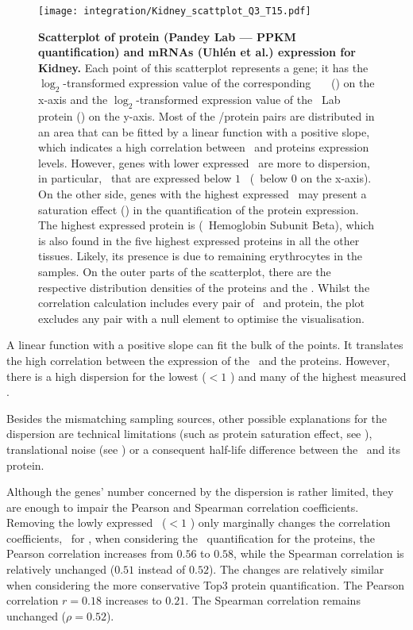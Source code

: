 \begin{figure}[!htbp]
    \texttt{[image: integration/Kidney\_scattplot\_Q3\_T15.pdf]}\centering
    \caption[Scatterplot of protein (Pandey Lab data --- PPKM quantification)
    and mRNA (Uhlén \etal) expression for Kidney]
    {\label{fig:ScatKid}\textbf{Scatterplot of
    protein (Pandey Lab --- PPKM quantification) and mRNAs (Uhlén et al.)
    expression for Kidney.}
    Each point of this scatterplot represents a gene;
    it has the $\log_2$-transformed expression value
    of the corresponding \uhlen\ \etal\ \mRNA\ (\FPKM) on the x-axis and
    the $\log_2$-transformed expression value of
    the \pandey\ Lab protein (\PPKM) on the y-axis.
    Most of the \mRNA/protein pairs are distributed in an area
    that can be fitted by a linear function with a positive slope,
    which indicates a high correlation between \mRNAs\ and proteins expression
    levels.
    However, genes with lower expressed \mRNAs\ are more to dispersion,
    in particular, \mRNAs\ that are expressed below $1$ \FPKM\ (\ie\ below $0$ on
    the x-axis).
    On the other side, genes with the highest expressed \mRNAs\ may present
    a saturation effect ()
    in the quantification of the protein expression.
    The highest expressed protein is 
    (\ie\ Hemoglobin Subunit Beta), which is also found in
    the five highest expressed proteins in all the other tissues.
    Likely, its presence is due to remaining erythrocytes in the samples.
    On the outer parts of the scatterplot,
    there are the respective distribution densities of the proteins and the \mRNAs.
    Whilst the correlation calculation includes every pair of \mRNA\ and protein,
    the plot excludes any pair with a null element to optimise the visualisation.}
\end{figure}

A linear function with a positive slope can fit the bulk of the points.
It translates the high correlation between the expression
of the \mRNAs\ and the proteins.
However, there is a high dispersion for the lowest ($<1$ \FPKM)
and many of the highest measured \mRNAs{}.

Besides the mismatching sampling sources,
other possible explanations for the dispersion are
technical limitations (such as protein saturation effect, see ),
translational noise (see )
or a consequent half-life difference between the \mRNA\ and its protein.

Although the genes' number concerned by the dispersion is rather limited,
they are enough to impair the Pearson and Spearman correlation coefficients.
Removing the lowly expressed \mRNAs\ ($<1$ \FPKM) only marginally changes
the correlation coefficients,
\eg\ for \kidney,
when considering the \PPKM\ quantification for the proteins,
the Pearson correlation
increases from $0.56$ to $0.58$,
while the Spearman correlation is relatively unchanged
($0.51$ instead of $0.52$).
The changes are relatively similar
when considering the more conservative Top3 protein quantification.
The Pearson correlation $r=0.18$ increases to $0.21$.
The Spearman correlation remains unchanged ($\rho=0.52$).


